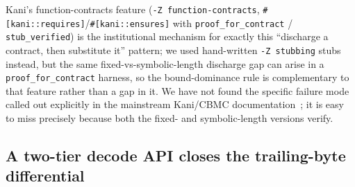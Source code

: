 \documentclass[10pt,twocolumn]{article}
\newcommand{\code}[1]{\texttt{\small #1}}
\begin{document}
Kani's function-contracts feature (\code{-Z function-contracts},
\code{\#[kani::requires]}/\code{\#[kani::ensures]} with
\code{proof\_for\_contract} / \code{stub\_verified}) is the institutional
mechanism for exactly this ``discharge a contract, then substitute it'' pattern;
we used hand-written \code{-Z stubbing} stubs instead, but the same
fixed-vs-symbolic-length discharge gap can arise in a \code{proof\_for\_contract}
harness, so the bound-dominance rule is complementary to that feature rather than
a gap in it. We have not found the specific failure mode called out explicitly
in the mainstream Kani/CBMC documentation~\cite{kani}; it is easy to miss
precisely because both the fixed- and symbolic-length versions verify.

\subsection{A two-tier decode API closes the trailing-byte differential}
\label{sec:twotier}
\end{document}
